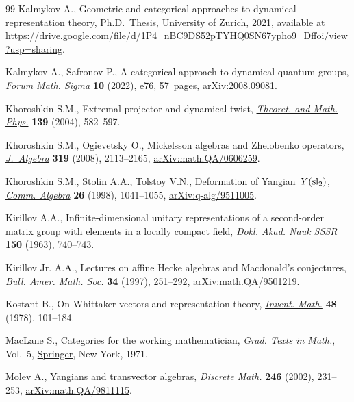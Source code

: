 \documentclass[pdftex]{sigma}
\numberwithin{equation}{section}
\begin{document}
\begin{thebibliography}{99}
Kalmykov A., Geometric and categorical approaches to dynamical representation theory, Ph.D.~Thesis, {U}niversity of Zurich, 2021, available at
 \url{https://drive.google.com/file/d/1P4_nBC9DS52pTYHQ0SN67ypho9_Dffoi/view?usp=sharing}.

Kalmykov A., Safronov P., A categorical approach to dynamical quantum groups,
 \href{https://doi.org/10.1017/fms.2022.68}{\textit{Forum Math. Sigma}} \textbf{10} (2022), e76, 57~pages,
 \href{https://arxiv.org/abs/2008.09081}{arXiv:2008.09081}.

Khoroshkin S.M., Extremal projector and dynamical twist, \href{https://doi.org/10.1023/B:TAMP.0000022749.42512.fd}{\textit{Theoret. and
 Math. Phys.}} \textbf{139} (2004), 582--597.

Khoroshkin S.M., Ogievetsky O., Mickelsson algebras and {Z}helobenko operators,
  \href{https://doi.org/10.1016/j.jalgebra.2007.04.020}{\textit{J.~Algebra}} \textbf{319} (2008), 2113--2165,
 \href{https://arxiv.org/abs/math.QA/0606259}{arXiv:math.QA/0606259}.

Khoroshkin S.M., Stolin A.A., Tolstoy V.N., Deformation of {Y}angian~{$Y({\rm
 sl}_2)$}, \href{https://doi.org/10.1080/00927879808826182}{\textit{Comm. Algebra}} \textbf{26} (1998), 1041--1055,
 \href{https://arxiv.org/abs/q-alg/9511005}{arXiv:q-alg/9511005}.

Kirillov A.A., Infinite-dimensional unitary representations of a second-order
 matrix group with elements in a locally compact field, \textit{Dokl. Akad.
 Nauk SSSR} \textbf{150} (1963), 740--743.

Kirillov Jr. A.A., Lectures on affine {H}ecke algebras and {M}acdonald's
 conjectures, \href{https://doi.org/10.1090/S0273-0979-97-00727-1}{\textit{Bull. Amer. Math. Soc.}} \textbf{34} (1997), 251--292,
 \href{https://arxiv.org/abs/math.QA/9501219}{arXiv:math.QA/9501219}.

Kostant B., On {W}hittaker vectors and representation theory, \href{https://doi.org/10.1007/BF01390249}{\textit{Invent.
 Math.}} \textbf{48} (1978), 101--184.

MacLane S., Categories for the working mathematician, \textit{Grad. Texts in
 Math.}, Vol.~5, \href{https://doi.org/10.1007/978-1-4757-4721-8}{Springer}, New York, 1971.

Molev A., Yangians and transvector algebras, \href{https://doi.org/10.1016/S0012-365X(01)00260-6}{\textit{Discrete Math.}} \textbf{246} (2002), 231--253,
 \href{https://arxiv.org/abs/math.QA/9811115}{arXiv:math.QA/9811115}.


\end{thebibliography}
\end{document}
